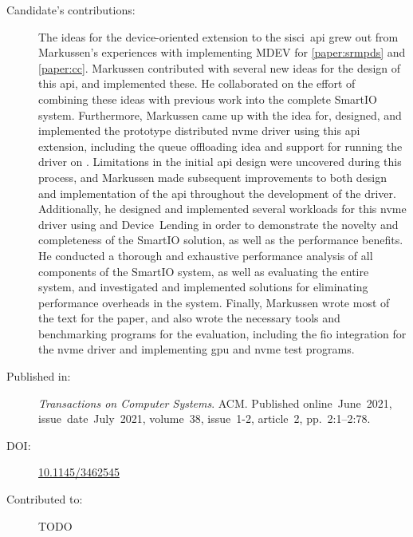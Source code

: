 \begin{description}
	\item[Candidate's contributions:]
		The ideas for the device-oriented extension to the \acrshort{sisci}~\acrshort{api} grew out from Markussen's experiences with implementing MDEV for \cref{paper:srmpds} and \cref{paper:cc}.
		Markussen contributed with several new ideas for the design of this \acrshort{api}, and implemented these.
		He collaborated on the effort of combining these ideas with previous work into the complete SmartIO system. 
		Furthermore, Markussen came up with the idea for, designed, and implemented the prototype distributed \acrshort{nvme} driver using this \acrshort{api} extension, 
		including the queue offloading idea and support for running the driver on .
		Limitations in the initial \acrshort{api} design were uncovered during this process, and Markussen made subsequent improvements to both design and implementation of the \acrshort{api} throughout the development of the driver.
		Additionally, he designed and implemented several workloads for this \acrshort{nvme} driver using  and Device~Lending
		in order to demonstrate the novelty and completeness of the SmartIO solution, as well as the performance benefits.
		He conducted a thorough and exhaustive performance analysis of all components of the SmartIO system,
		as well as evaluating the entire system, and investigated and implemented solutions for eliminating performance overheads in the system.
		Finally, Markussen wrote most of the text for the paper, and also wrote the necessary tools and benchmarking programs for the evaluation,
		including the \acrshort{fio} integration for the \acrshort{nvme} driver and implementing \acrshort{gpu} and \acrshort{nvme} test programs.
		

	\item[Published in:]
		\emph{Transactions on Computer Systems}. ACM.
		Published online~June~2021,
		issue~date~July~2021, 
		volume~38, issue~1-2, article~2, pp.~2:1--2:78.

	\item[DOI:] \href{https://doi.org/10.1145/3462545}{10.1145/3462545}

	\item[Contributed to:]
		TODO

\end{description}

